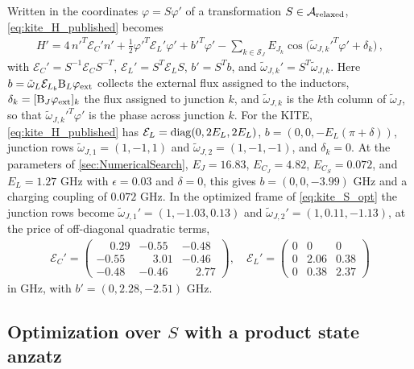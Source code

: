 Written in the coordinates $\varphi=S\varphi'$ of a transformation $S\in\mathcal A_{\rm relaxed}$, \cref{eq:kite_H_published} becomes
\begin{align}
    H' = 4\,n'^T\mathcal E_C' n' + \tfrac12\varphi'^T\mathcal E_L'\varphi' + b'^T\varphi' - \sum_{k\in\mathcal S_J}E_{J_k}\cos\bigl(\tilde\omega_{J,k}'^T\varphi'+\delta_k\bigr) \, ,
    \label{eq:H_frame}
\end{align}
with $\mathcal E_C'=S^{-1}\mathcal E_C S^{-T}$, $\mathcal E_L'=S^T\mathcal E_L S$, $b'=S^Tb$, and $\tilde\omega_{J,k}'=S^T\tilde\omega_{J,k}$.
Here $b=\tilde\omega_L\mathcal E_{L_b}\mathrm{B}_L\varphi_{\rm ext}$ collects the external flux assigned to the inductors, $\delta_k=[\mathrm{B}_J\varphi_{\rm ext}]_k$ the flux assigned to junction $k$, and $\tilde\omega_{J,k}$ is the $k$th column of $\tilde\omega_J$, so that $\tilde\omega_{J,k}'^T\varphi'$ is the phase across junction $k$.
For the KITE, \cref{eq:kite_H_published} has $\mathcal E_L={\rm diag}(0,2E_L,2E_L)$, $b=(0,0,-E_L(\pi+\delta))$, junction rows $\tilde\omega_{J,1}=(1,-1,1)$ and $\tilde\omega_{J,2}=(1,-1,-1)$, and $\delta_k=0$.
At the parameters of \cref{sec:NumericalSearch}, $E_J=16.83$, $E_{C_J}=4.82$, $E_{C_S}=0.072$, and $E_L=1.27$ GHz with $\epsilon=0.03$ and $\delta=0$, this gives $b=(0,0,-3.99)$ GHz and a charging coupling of $0.072$ GHz.
In the optimized frame of \cref{eq:kite_S_opt} the junction rows become $\tilde\omega_{J,1}'=(1,-1.03,0.13)$ and $\tilde\omega_{J,2}'=(1,0.11,-1.13)$, at the price of off-diagonal quadratic terms,
\begin{align*}
    \mathcal E_C'=\begin{pmatrix}\phantom{-}0.29&-0.55&-0.48\\-0.55&\phantom{-}3.01&-0.46\\-0.48&-0.46&\phantom{-}2.77\end{pmatrix},\quad
    \mathcal E_L'=\begin{pmatrix}0&0&0\\0&2.06&0.38\\0&0.38&2.37\end{pmatrix}
\end{align*}
in GHz, with $b'=(0,2.28,-2.51)$ GHz.

\subsection{Optimization over $S$ with a product state anzatz}

